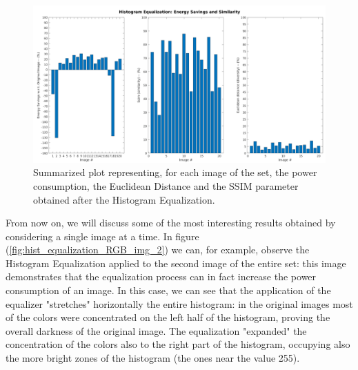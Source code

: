 \documentclass[a4paper]{article}
\begin{document}
            \begin{figure}[htp]
                \centering
                \includegraphics[width=0.8 \columnwidth]{./screenshots/HistEqOverall}
                \caption{
                        \label{fig:HistEqOverall}
                        Summarized plot representing, for each image of the set, the power consumption, the Euclidean Distance and the SSIM parameter obtained after the Histogram Equalization.
                }
            \end{figure}

            From now on, we will discuss some of the most interesting results obtained by considering a single image at a time.
            In figure (\ref{fig:hist_equalization_RGB_img_2}) we can, for example, observe the Histogram Equalization applied to the second image of the entire set: this image demonstrates that the equalization process can in fact increase the power consumption of an image. In this case, we can see that the application of the equalizer "stretches" horizontally the entire histogram: in the original images most of the colors were concentrated on the left half of the histogram, proving the overall darkness of the original image. The equalization "expanded" the concentration of the colors also to the right part of the histogram, occupying also the more bright zones of the histogram (the ones near the value 255).
\end{document}
